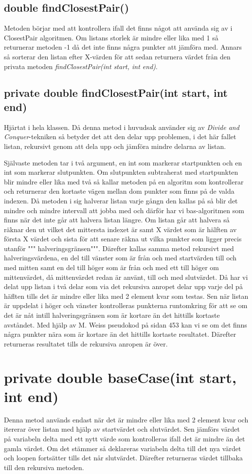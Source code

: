 \documentclass[a5paper,10pt,oneside]{article}
\begin{document}
\subsection{double findClosestPair()} 
Metoden börjar med att kontrollera ifall det finns något att använda sig av i ClosestPair algoritmen. Om listans storlek är mindre eller lika med 1 så returnerar metoden -1 då det inte finns några punkter att jämföra med. Annars så sorterar den listan efter X-värden för att sedan returnera värdet från den privata metoden \textit{findClosestPair(int start, int end)}.

\subsection{private double findClosestPair(int start, int end)} 
Hjärtat i hela klassen.
Då denna metod i huvudsak använder sig av \textit{Divide and Conquer}-tekniken så betyder det att den delar upp problemen, i det här fallet listan, rekursivt genom att dela upp och jämföra mindre delarna av listan.

Självaste metoden tar i två argument, en int som markerar startpunkten och en int som markerar slutpunkten. Om slutpunkten subtraherat med startpunkten blir mindre eller lika med två så kallar metoden på en algoritm som kontrollerar och returnerar den kortaste vägen mellan dom punkter som finns på de valda indexen. Då metoden i sig halverar listan varje gångn den kallas på så blir det mindre och mindre intervall att jobba med och därför har vi bas-algoritmen som finns när det inte går att halvera listan längre. Om listan går att halvera så räknar den ut vilket det mittersta indexet är samt X värdet som är hälften av första X värdet och sista för att senare räkna ut vilka punkter som ligger precis utanför """ halveringsgränsen""". Därefter kallas samma metod rekursivt med halveringsvärdena, en del till vänster som är från och med startvärden till och med mitten samt en del till höger som är från och med ett till höger om mittenvärdet, då mittenvärdet redan är använt, till och med slutvärdet.
Då har vi delat upp listan i två delar som via det rekursiva anropet delar upp varje del på häflten tills det är mindre eller lika med 2 element kvar som testas. Sen när listan är uppdelat i höger och vänster kontrolleras punkterna runtomkring för att se om det är nåt intill halveringsgränsen som är kortare än det hittills kortaste avståndet. Med hjälp av M. Weiss pseudokod på sidan 453 kan vi se om det finns några punkter nära som är kortare än det hittills kortaste resultatet.
Därefter returneras resultatet tills de rekursiva anropen är över.

\section{private double baseCase(int start, int end)} 
Denna metod används endast när det är mindre eller lika med 2 element kvar  och itererar över listan med hjälp av startvärdet och slutvärdet. Sen jämförs värdet på variabeln delta med ett nytt värde som kontrolleras ifall det är mindre än det gamla värdet. Om det stämmer så deklareras variabeln delta till det nya värdet och loopen fortsätter tills det når slutvärdet.
Därefter returneras värdet tillbaka till den rekursiva metoden.
\end{document}
